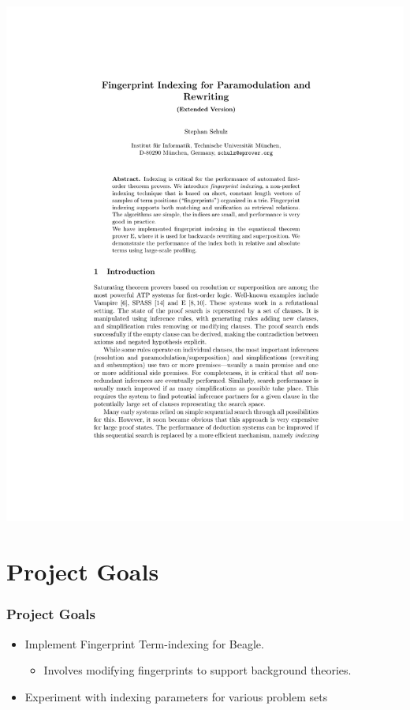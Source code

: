 \documentclass[10pt]{beamer}
\begin{document}
\begin{frame}
\begin{center}
  \hspace{1cm}
  \includegraphics[page=14,scale=0.5,trim=6cm 16.2cm 7cm 4cm,clip]{schulz_fp-index_ext}
  \end{center}
\end{frame}

\section{Project Goals}

\begin{frame}
  \frametitle{Project Goals}
  \begin{itemize}
  \item<1-> Implement Fingerprint Term-indexing for Beagle.
  \begin{itemize}
  \item<1-> Involves modifying fingerprints to support background theories.
  \end{itemize}
  \item<2-> Experiment with indexing parameters for various problem sets
  \end{itemize}
\end{frame}
\end{document}
